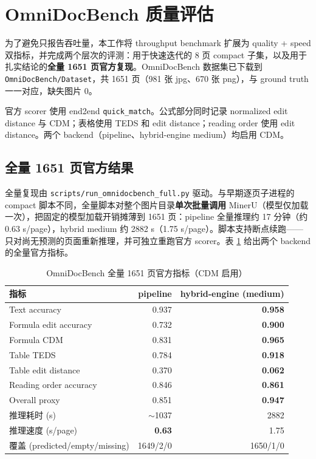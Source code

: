 \documentclass[UTF8,a4paper,11pt]{ctexart}
\begin{document}
\section{OmniDocBench 质量评估}
\label{sec:full-omni}

为了避免只报告吞吐量，本工作将 throughput benchmark 扩展为 quality + speed 双指标，并完成两个层次的评测：用于快速迭代的 8 页 compact 子集，以及用于扎实结论的\textbf{全量 1651 页官方复现}。OmniDocBench 数据集已下载到 \texttt{OmniDocBench/Dataset}，共 1651 页（981 张 jpg、670 张 png），与 ground truth 一一对应，缺失图片 0。

官方 scorer 使用 end2end \texttt{quick\_match}。公式部分同时记录 normalized edit distance 与 CDM；表格使用 TEDS 和 edit distance；reading order 使用 edit distance。两个 backend（pipeline、hybrid-engine medium）均启用 CDM。

\subsection{全量 1651 页官方结果}

全量复现由 \texttt{scripts/run\_omnidocbench\_full.py} 驱动。与早期逐页子进程的 compact 脚本不同，全量脚本对整个图片目录\textbf{单次批量调用} MinerU（模型仅加载一次），把固定的模型加载开销摊薄到 1651 页：pipeline 全量推理约 17 分钟（约 0.63 s/page），hybrid medium 约 2882 s（1.75 s/page）。脚本支持断点续跑——只对尚无预测的页面重新推理，并可独立重跑官方 scorer。表 \ref{tab:full-quality} 给出两个 backend 的全量官方指标。

\begin{table}[H]
\centering
\caption{OmniDocBench 全量 1651 页官方指标（CDM 启用）}
\label{tab:full-quality}
\begin{tabular}{lrr}
\toprule
指标 & pipeline & hybrid-engine (medium) \\
\midrule
Text accuracy        & 0.937 & \textbf{0.958} \\
Formula edit accuracy & 0.732 & \textbf{0.900} \\
Formula CDM          & 0.831 & \textbf{0.965} \\
Table TEDS           & 0.784 & \textbf{0.918} \\
Table edit distance  & 0.370 & \textbf{0.062} \\
Reading order accuracy & 0.846 & \textbf{0.861} \\
Overall proxy        & 0.851 & \textbf{0.947} \\
\midrule
推理耗时 (s)         & $\sim$1037 & 2882 \\
推理速度 (s/page)    & \textbf{0.63} & 1.75 \\
覆盖 (predicted/empty/missing) & 1649/2/0 & 1650/1/0 \\
\bottomrule
\end{tabular}
\end{table}
\end{document}
